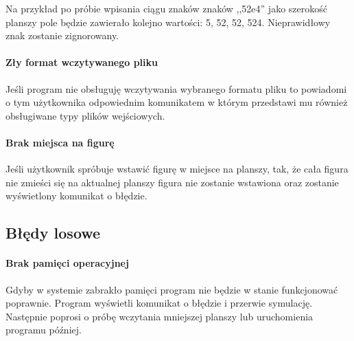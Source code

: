 \documentclass{report}
\begin{document}
Na przykład po próbie wpisania ciągu znaków znaków ,,52e4'' jako szerokość planszy pole będzie zawierało kolejno wartości: 5, 52, 52, 524. Nieprawidłowy znak zostanie zignorowany.

\paragraph{Zły format wczytywanego pliku}
Jeśli program nie obsługuję wczytywania wybranego formatu pliku to powiadomi o tym użytkownika odpowiednim komunikatem w którym  przedstawi mu również obsługiwane typy plików wejściowych.

\paragraph{Brak miejsca na figurę}
Jeśli użytkownik spróbuje wstawić figurę w miejsce na planszy, tak, że cała figura nie zmieści się na aktualnej planszy figura nie zostanie wstawiona oraz zostanie wyświetlony komunikat o błędzie.

\subsection{Błędy losowe}
\paragraph{Brak pamięci operacyjnej}
Gdyby w systemie zabrakło pamięci program nie będzie w stanie funkcjonować poprawnie. Program wyświetli komunikat o błędzie i przerwie symulację. Następnie poprosi o próbę wczytania mniejszej planszy lub uruchomienia programu później.
\end{document}
